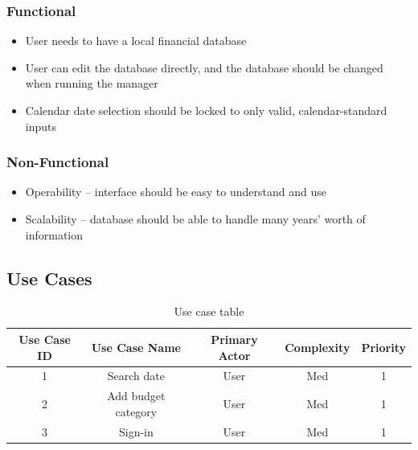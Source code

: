 \documentclass[10pt,conference,onecolumn,compsoc]{IEEEtran}
\begin{document}

\subsubsection{Functional}
\begin{itemize}
\item User needs to have a local financial database
\item User can edit the database directly, and the database should be changed when running the manager
\item Calendar date selection should be locked to only valid, calendar-standard inputs
\end{itemize}


\subsubsection{Non-Functional}
\begin{itemize}
\item Operability -- interface should be easy to understand and use
\item Scalability -- database should be able to handle many years' worth of information
\end{itemize}


\subsection{Use Cases}


\begin{table}
\centering
\begin{tabular}{|c|c|c|c|c|}
\hline
Use Case ID & Use Case Name & Primary Actor & Complexity & Priority \\
\hline \hline
1 & Search date & User & Med & 1\\
\hline
2 & Add budget category & User & Med & 1\\
\hline
3 & Sign-in & User & Med & 1\\
\hline

\end{tabular}
\caption{Use case table}
\label{tab:useCaseIndex}
\end{table}
\end{document}

